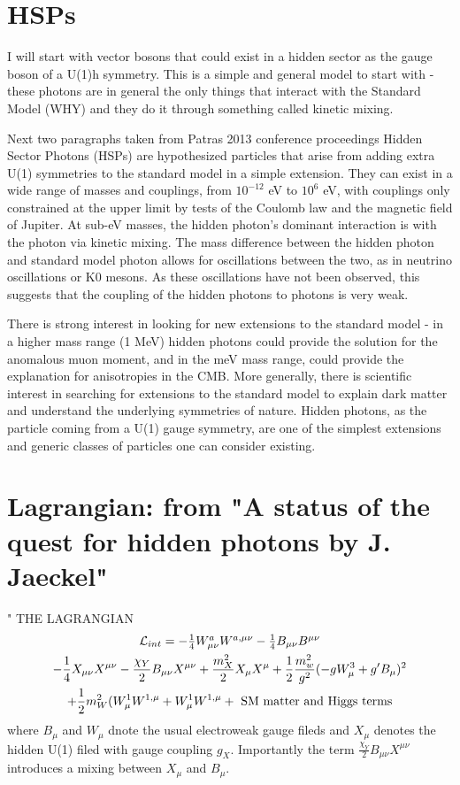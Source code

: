 \documentclass[12pt, twoside]{book}
\begin{document}
\section{HSPs}

I will start with vector bosons that could exist in a hidden sector as the gauge boson of a U(1)h symmetry. This is a simple and general model to start with - these photons are in general the only things that interact with the Standard Model (WHY) and they do it through something called kinetic mixing.

{\color{blue} Next two paragraphs taken from Patras 2013 conference proceedings}
Hidden Sector Photons (HSPs)  are hypothesized particles that arise from adding extra U(1) symmetries to the standard model in a simple extension. They can exist in a wide range of masses and couplings, from $10^{-12}$ eV to $10^6$ eV, with couplings only constrained at the upper limit by tests of the Coulomb law and the magnetic field of Jupiter. At sub-eV masses, the hidden photon's dominant interaction is with the photon via kinetic mixing. The mass difference between the hidden photon and standard model photon allows for oscillations between the two, as in neutrino oscillations or K0 mesons. As these oscillations have not been observed, this suggests that the coupling of the hidden photons to photons is very weak.

There is strong interest in looking for new extensions to the standard model - in a higher mass range (1 MeV) hidden photons could provide the solution for the anomalous muon moment, and in the meV mass range, could provide the explanation for anisotropies in the CMB. More generally, there is scientific interest in searching for extensions to the standard model to explain dark matter and understand the underlying symmetries of nature. Hidden photons, as the particle coming from a U(1) gauge symmetry, are one of the simplest extensions and generic classes of particles one can consider existing. 


\section{Lagrangian: from "A status of the quest for hidden photons by J. Jaeckel"}
" 
THE LAGRANGIAN
\begin{multline}
$$\mathcal{L}_{int} = -\frac{1}{4}W_{\mu\nu}^aW^{a,\mu\nu}-\frac{1}{4}B_{\mu\nu}B^{\mu\nu} \\ - \frac{1}{4}X_{\mu\nu}X^{\mu\nu} - \frac{\chi_Y}{2}B_{\mu\nu}X^{\mu\nu} + \frac{m_X^2}{2}X_{\mu}X^{\mu}+\frac{1}{2}\frac{m_w^2}{g^2}(-gW_{\mu}^3 + g'B_{\mu})^2 \\ +\frac{1}{2}m_W^2(W_{\mu}^1W^{1,\mu}+W_{\mu}^1W^{1,\mu}+\text{ SM matter and Higgs terms}  $$
\end{multline}
where $B_{\mu}$ and $W_{\mu}$ dnote the usual electroweak gauge fileds and $X_{\mu}$ denotes the hidden U(1) filed with gauge coupling $g_X$. Importantly the term $ \frac{\chi_Y}{2}B_{\mu\nu}X^{\mu\nu} $ introduces a mixing between $X_{\mu}$ and $B_{\mu}$.
\end{document}
